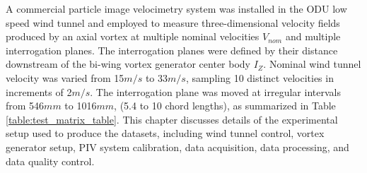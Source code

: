 A commercial particle image velocimetry system was installed in the ODU low 
speed 
wind tunnel and employed to measure three-dimensional velocity fields produced 
by an axial vortex at multiple nominal velocities $V_{nom}$ and multiple 
interrogation planes. The interrogation planes were defined by their 
distance downstream of the bi-wing vortex generator center body
$I_Z$. Nominal wind tunnel velocity was varied from 15$m/s$ to 33$m/s$, 
sampling 10 distinct velocities in increments of 2$m/s$. The interrogation 
plane was moved at irregular intervals from 546$mm$ to 1016$mm$, (5.4 to 10 
chord lengths), as summarized in Table \ref{table:test_matrix_table}. This 
chapter 
discusses details of the experimental setup used to produce the datasets, 
including wind tunnel control, vortex generator setup, PIV system calibration, 
data acquisition, data processing, and data quality control.